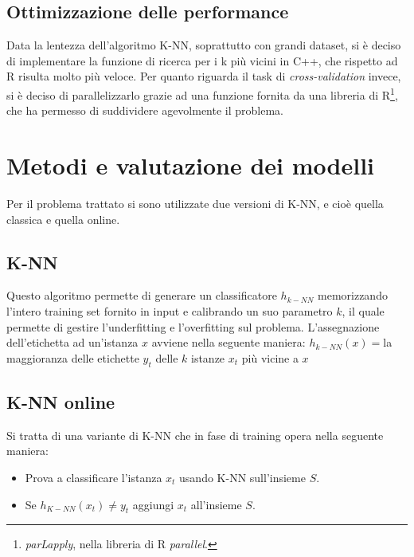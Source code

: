 \documentclass[fleqn,10pt]{SelfArx} %
\begin{document}
\subsection{Ottimizzazione delle performance}
Data la lentezza dell'algoritmo K-NN, soprattutto con grandi dataset, si è deciso di implementare la funzione di ricerca per i k più vicini in C++, che rispetto ad R risulta molto più veloce. Per quanto riguarda il task di \emph{cross-validation} invece, si è deciso di parallelizzarlo grazie ad una funzione fornita da una libreria di R\footnote{\emph{parLapply}, nella libreria di R \emph{parallel}.}, che ha permesso di suddividere agevolmente il problema.




\section{Metodi e valutazione dei modelli}

Per il problema trattato si sono utilizzate due versioni di K-NN, e cioè quella classica e quella online.

\subsection{K-NN}
Questo algoritmo permette di generare un classificatore $h_{k-NN}$ memorizzando l'intero training set fornito in input e calibrando un suo parametro $k$, il quale permette di gestire l'underfitting e l'overfitting sul problema.
\newline
\newline
L'assegnazione dell'etichetta ad un'istanza $x$ avviene nella seguente maniera:
\newline
\newline
\textbf{$h_{k-NN}(x)=$}la maggioranza delle etichette $y_t$ delle $k$ istanze $x_t$ più vicine a $x$

\subsection{K-NN online}
Si tratta di una variante di K-NN che in fase di training opera nella seguente maniera:
\begin{itemize}
\item Prova a classificare l'istanza $x_t$ usando K-NN sull'insieme $S$.
\item Se $h_{K-NN}(x_t)\neq y_t$ aggiungi $x_t$ all'insieme $S$.
\end{itemize}
\end{document}
